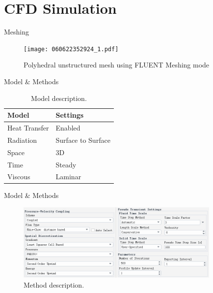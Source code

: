 \documentclass[10pt, xcolor=table]{beamer}
\begin{document}
\section{CFD Simulation}
\begin{frame}{Meshing}
	
	\begin{figure}
		\texttt{[image: 060622352924\_1.pdf]}
		\caption{Polyhedral unstructured mesh using FLUENT Meshing mode}
	\end{figure}	
\end{frame}
\begin{frame}{Model \& Methods}
	\begin{table}[]
		\begin{tabular}{l|l}
		\hline
		Model           & Settings           \\ \hline
		Heat   Transfer & Enabled            \\
		Radiation       & Surface to Surface \\
		Space           & 3D                 \\
		Time            & Steady             \\
		Viscous         & Laminar            \\ \hline
		\end{tabular}
		\caption[]{Model description.}
	\end{table}
\end{frame}
\begin{frame}{Model \& Methods}
	\begin{figure}
		\includegraphics[width=10cm]{figure4.jpg}
		\caption{Method description.}
	\end{figure}	
\end{frame}
\end{document}
